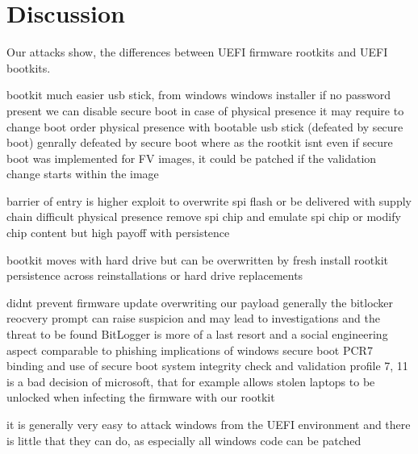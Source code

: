 


\chapter{Discussion}


Our attacks show, the differences between \ac{UEFI} firmware rootkits and \ac{UEFI} bootkits.


bootkit much easier
usb stick, from windows
windows installer
if no password present we can disable secure boot
in case of physical presence it may require to change boot order
physical presence with bootable usb stick (defeated by secure boot)
genrally defeated by secure boot where as the rootkit isnt
even if secure boot was implemented for FV images, it could be patched if the validation change starts within the image

barrier of entry is higher
exploit to overwrite spi flash or be delivered with supply chain difficult
physical presence remove spi chip and emulate spi chip or modify chip content
but high payoff with persistence

bootkit moves with hard drive but can be overwritten by fresh install
rootkit persistence across reinstallations or hard drive replacements



didnt prevent firmware update overwriting our payload
generally the bitlocker reocvery prompt can raise suspicion and may lead to investigations and the threat to be found
BitLogger is more of a last resort and a social engineering aspect comparable to phishing
implications of windows secure boot PCR7 binding and use of secure boot system integrity check and validation profile 7, 11 is a bad decision of microsoft, that for example allows stolen laptops to be unlocked when infecting the firmware with our rootkit

it is generally very easy to attack windows from the \ac{UEFI} environment and there is little that they can do, as especially all windows code can be patched


